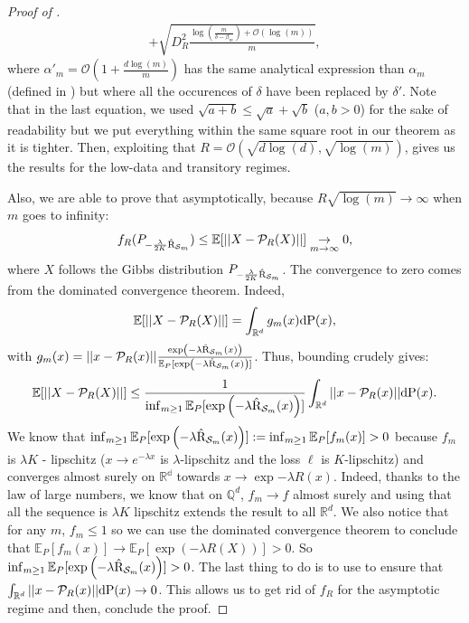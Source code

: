 \begin{proof}[Proof of ]
\begin{multline}
+\sqrt{ D_R^2\frac{\log\left( \frac{m}{\delta-\beta_m} \right) +\mathcal{O}(\log(m)) }{m}},
\end{multline}
where $\alpha'_m= \mathcal{O}(1+ \frac{d\log(m)}{m})$ has the same analytical expression than $\alpha_m$ (defined in ) but where all the occurences of $\delta$ have been replaced by $\delta'$.
Note that in the last equation, we used $\sqrt{a+b} \leq \sqrt{a} + \sqrt{b}$ ($a,b>0$) for the sake of readability but we put everything within the same square root in our theorem as it is tighter.
Then, exploiting that $R= \mathcal{O}(\sqrt{d\log (d)}, \sqrt{\log(m)})$, gives us the results for the low-data and transitory regimes.
\medskip

\noindent Also, we are able to prove that asymptotically, because $R \sqrt{\log(m)}\rightarrow \infty$ when $m$ goes to infinity:
$$f_R(P_{-\frac{\lambda}{2K} \Riskhat_{\Sm}}) \leq \mathbb{E}[||X-\mathcal{P}_{R}(X)||] \underset{m\rightarrow \infty}{\rightarrow} 0,    $$
where $X$ follows the Gibbs distribution $P_{-\frac{\lambda}{2K} \Riskhat_{\Sm}}$. The convergence to zero comes from the dominated convergence theorem.
Indeed,
\[ \mathbb{E}[||X-\mathcal{P}_{R}(X)||] = \int_{\mathbb{R}^d} g_m(x) \mathrm{d}\P(x), \]
with $g_m(x)= ||x - \mathcal{P}_{R}(x)||\frac{\exp\left(-\lambda \Riskhat_{\Sm}(x) \right)}{\mathbb{E}_P[\exp\left(-\lambda \Riskhat_{\Sm}(x) \right)]}$. Thus, bounding crudely gives:
\[  \mathbb{E}[||X-\mathcal{P}_{R}(X)||] \leq \frac{1}{\inf_{m\geq 1} \mathbb{E}_P[\exp\left(-\lambda \Riskhat_{\Sm}(x) \right)]} \int_{\mathbb{R}^d} ||x - \mathcal{P}_{R}(x)|| \mathrm{d}\P(x).\]
We know that $\inf_{m\geq 1} \mathbb{E}_P[\exp\left(-\lambda \Riskhat_{\Sm}(x) \right)] := \inf_{m\geq 1} \mathbb{E}_P[f_m(x) ] >0$ because $f_m$ is $\lambda K$ - lipschitz ($x \rightarrow e^{- \lambda x}$ is $\lambda$-lipschitz and the loss $\ell$ is $K$-lipschitz)
and converges almost surely on $\mathbb{R^d}$ towards $x\rightarrow \exp{-\lambda R(x)}$. Indeed, thanks to the law of large numbers, we know that on $\mathbb{Q}^d$, $f_m \rightarrow f$ almost surely and using that all the sequence is $\lambda K$ lipschitz extends the result to all $\mathbb{R}^d$.
We also notice that for any $m$, $f_m \leq 1$ so we can use the dominated convergence theorem to conclude that $\mathbb{E}_P[f_m(x)] \rightarrow  \mathbb{E}_P[\exp(-\lambda R(X)) ] >0.$ So $\inf_{m\geq 1} \mathbb{E}_P[\exp\left(-\lambda \Riskhat_{\Sm}(x) \right)]>0$.
The last thing to do is to use  to ensure that $\int_{\mathbb{R}^d} ||x - \mathcal{P}_{R}(x)|| \mathrm{d}\P(x) \rightarrow 0$.
This allows us to get rid of $f_R$ for the asymptotic regime and then, conclude the proof.
\end{proof}



